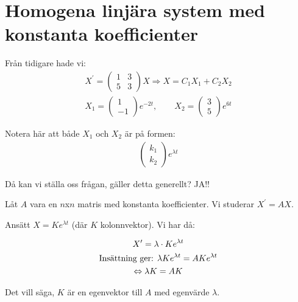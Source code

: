 \section{Homogena linjära system med konstanta koefficienter}
\par\bigskip
\noindent Från tidigare hade vi:
\begin{equation*}
  \begin{gathered}
    X^{\prime} = \begin{pmatrix}1&3\\5&3\end{pmatrix}X \Rightarrow X = C_1X_1+C_2X_2\\
    X_1 = \begin{pmatrix}1\\-1\end{pmatrix}e^{-2t}, \qquad X_2 = \begin{pmatrix}3\\5\end{pmatrix}e^{6t}
  \end{gathered}
\end{equation*}
\par\bigskip
\noindent Notera här att både $X_1$ och $X_2$ är på formen:
\begin{equation*}
  \begin{gathered}
    \begin{pmatrix}k_1\\k_2\end{pmatrix}e^{\lambda t}
  \end{gathered}
\end{equation*}
\par\bigskip
\noindent Då kan vi ställa oss frågan, gäller detta generellt? JA!!
\par\bigskip
\noindent Låt $A$ vara en $n$x$n$ matris med konstanta koefficienter. Vi studerar $X^{\prime} = AX$.\par
\noindent Ansätt $X = Ke^{\lambda t}$ (där $K$ kolonnvektor). Vi har då:

\begin{equation*}
  \begin{gathered}
    X^{\prime} = \lambda\cdot K e^{\lambda t}\\
    \text{Insättning ger: } \lambda K e^{\lambda t} = AKe^{\lambda t}\\
    \Leftrightarrow\lambda K = AK
  \end{gathered}
\end{equation*}
\par\bigskip
\noindent Det vill säga, $K$ är en egenvektor till $A$ med egenvärde $\lambda$.
\par\bigskip
